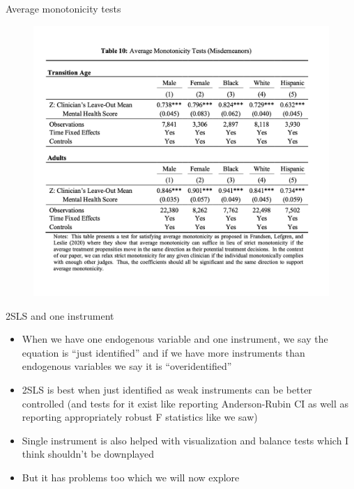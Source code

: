\documentclass{beamer}
\begin{document}
\begin{frame}{Average monotonicity tests}
	\begin{figure}
             \centering
             \includegraphics[scale=0.3]{./lecture_includes/jhr_ivfig5}
	\end{figure}
\end{frame}










\begin{frame}{2SLS and one instrument}

\begin{itemize}

\item When we have one endogenous variable and one instrument, we say the equation is ``just identified'' and if we have more instruments than endogenous variables we say it is ``overidentified''
\item 2SLS is best when just identified as weak instruments can be better controlled (and tests for it exist like reporting Anderson-Rubin CI as well as reporting appropriately robust F statistics like we saw)
\item Single instrument is also helped with visualization and balance tests which I think shouldn't be downplayed
\item But it has problems too which we will now explore

\end{itemize}

\end{frame}
\end{document}
